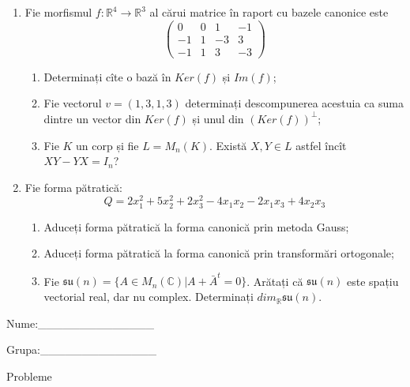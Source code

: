 \documentclass{article}
\begin{document}
\begin{enumerate}
 \item Fie morfismul $f:\mathbb{R}^4 \to \mathbb{R}^3$ al cărui matrice în raport cu bazele canonice este
$$\begin{pmatrix}
0&0&1&-1\\
-1&1&-3&3\\
-1&1&3&-3
\end{pmatrix}$$

\begin{enumerate}
\item Determinați cîte o bază în $Ker(f)$ și $Im(f)$;
\item Fie vectorul $v=(1,3,1,3)$ determinați descompunerea acestuia ca suma dintre un vector din $Ker(f)$ și unul din $(Ker(f))^\perp$;
\item Fie $K$ un corp și fie $L=M_n(K)$. Există $X,Y \in L$ astfel încît $XY-YX=I_n$?  
\end{enumerate}
\item Fie forma pătratică:
$$Q= 2x_1^2+5x_2^2+2x_3^2-4x_1x_2-2x_1x_3+4x_2x_3$$

\begin{enumerate}
\item Aduceți forma pătratică la forma canonică prin metoda Gauss;
\item Aduceți forma pătratică la forma canonică prin transformări ortogonale;
\item Fie $\mathfrak{su}(n)=\{ A \in M_n(\mathbb{C}) | A+\bar{A}^t=0\}$. Arătați că $\mathfrak{su}(n)$ este spațiu vectorial real, dar nu complex.
Determinați $dim_{\mathbb{R}}\mathfrak{su}(n)$.
\end{enumerate}
\end{enumerate}
\newpage
\begin{flushright}
Nume:\_\_\_\_\_\_\_\_\_\_\_\_\_\_
 
 
Grupa:\_\_\_\_\_\_\_\_\_\_\_\_\_\_
\end{flushright}
\begin{center}
\vspace{2cm}
{\Large Probleme}
\vspace{2cm}
\end{center}
\end{document}
